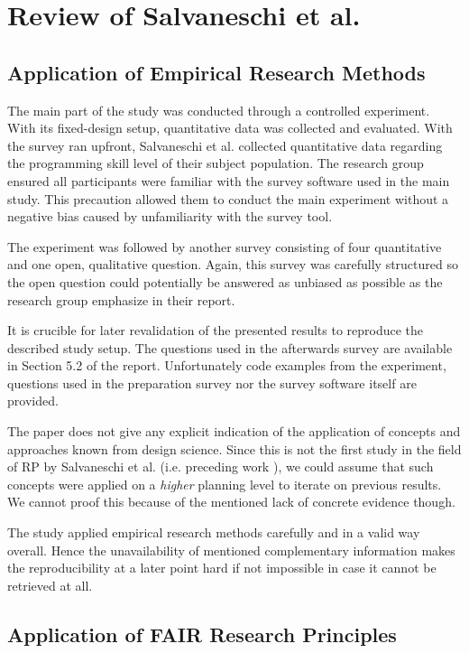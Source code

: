 \documentclass[12pt,a4paper]{article}
\begin{document}
\section{Review of Salvaneschi et al.}
\label{sec:review}

\subsection{Application of Empirical Research Methods}

The main part of the study was conducted through a controlled experiment. With its fixed-design setup, quantitative data was collected and evaluated. With the survey ran upfront, Salvaneschi et al. collected quantitative data regarding the programming skill level of their subject population. The research group ensured all participants were familiar with the survey software used in the main study. This precaution allowed them to conduct the main experiment without a negative bias caused by unfamiliarity with the survey tool.

The experiment was followed by another survey consisting of four quantitative and one open, qualitative question. Again, this survey was carefully structured so the open question could potentially be answered as unbiased as possible as the research group emphasize in their report.

It is crucible for later revalidation of the presented results to reproduce the described study setup. The questions used in the afterwards survey are available in Section 5.2 of the report. Unfortunately code examples from the experiment, questions used in the preparation survey nor the survey software itself are provided.

The paper does not give any explicit indication of the application of concepts and approaches known from design science. Since this is not the first study in the field of RP by Salvaneschi et al. (i.e. preceding work \cite{Salvaneschi:2014:ESP:2635868.2635895}), we could assume that such concepts were applied on a \emph{higher} planning level to iterate on previous results. We cannot proof this because of the mentioned lack of concrete evidence though.

The study applied empirical research methods carefully and in a valid way overall. Hence the unavailability of mentioned complementary information makes the reproducibility at a later point hard if not impossible in case it cannot be retrieved at all.

\subsection{Application of FAIR Research Principles}
\end{document}
